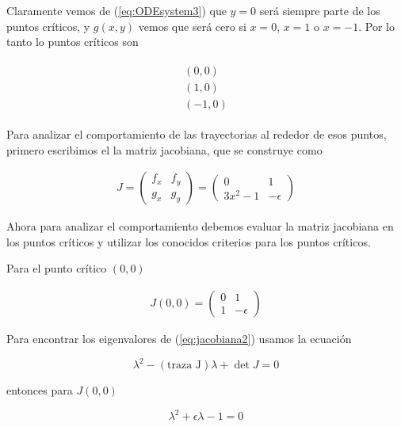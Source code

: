 \documentclass[a4paper,10pt]{article}
\numberwithin{equation}{section}
\begin{document}
Claramente vemos de (\ref{eq:ODEsystem3}) que $y=0$ será siempre parte de los puntos críticos,
y $g(x,y)$ vemos que será cero si $x=0$, $x=1$ o $x=-1$. Por lo tanto lo puntos críticos son

\begin{align}
 \begin{split}
  (0,0) \\
  (1,0) \\
  (-1,0) 
 \label{eq:puntoscriticos1}
 \end{split}
\end{align}

Para analizar el comportamiento de las trayectorias al rededor de esos puntos, primero escribimos 
el la matriz jacobiana, que se construye como


\begin{align}
J = \begin{pmatrix}
     f_x & f_y \\
     g_x & g_y
\end{pmatrix} = \begin{pmatrix}
		0 & 1 \\
		3x^2 -1 & -\epsilon
		\end{pmatrix}
\label{eq:jacobiana1}
\end{align}

Ahora para analizar el comportamiento debemos evaluar la matriz jacobiana en los puntos
críticos y utilizar los conocidos criterios para los puntos críticos. 

\vspace{.3cm}

Para el punto crítico $(0,0)$

\begin{align}
J(0,0) = \begin{pmatrix}
     0 & 1 \\
     1 & -\epsilon
\end{pmatrix}
\label{eq:jacobiana2}
\end{align}

Para encontrar los eigenvalores de (\ref{eq:jacobiana2}) usamos la ecuación

\begin{equation}
 \lambda^2 - (\text{traza J}) \lambda + \det{J} = 0
 \label{eq:calcEigenvalores}
\end{equation}

entonces para $J(0,0)$

\begin{equation}
 \lambda^2 + \epsilon \lambda - 1 = 0
\end{equation}
\end{document}
